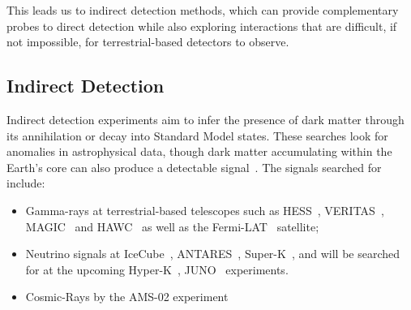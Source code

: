 This leads us to indirect detection methods, which can provide complementary probes to direct detection while also exploring interactions that are difficult, if not impossible, for terrestrial-based detectors to observe.
\subsection{Indirect Detection}

Indirect detection experiments aim to infer the presence of dark matter through its annihilation or decay into Standard Model states. 
These searches look for anomalies in astrophysical data, though dark matter accumulating within the Earth's core can also produce a detectable signal~\cite{Lee:2013iua_jan_Constrainingdarkmatter, ANTARES:2016bxz_SearchDarkMatter}. The signals searched for include: 
\begin{itemize}
    \item Gamma-rays at terrestrial-based telescopes such as HESS~\cite{HESS:2018cbt_may_SearchgRayLine, Montanari:2023bzn_jul_Searchdarkmatter, HESS:2006zwn_ObservationsGalacticCenter}, VERITAS~\cite{VERITAS:2017tif_apr_DarkMatterConstraints, Ryan:2023yzu_jul_SearchDarkMatter, McGrath:2023oto_jul_IndirectsearchDark, McGrath:2023oto_IndirectsearchDarkMcGrath:2023btk_IndirectsearchDark, Ryan:2023yzu_jul_SearchDarkMatter}, MAGIC~\cite{MAGIC:2009tyk_MAGICGammaRayTelescope, MAGIC:2011nta_SearchesDarkMatter, MAGIC:2011nta_SearchesDarkMatter, MAGIC:2009tyk_MAGICGammaRayTelescope} and HAWC~\cite{HAWC:2017mfa_feb_DarkMatterLimits, HAWC:2017udy_feb_SearchDarkMatter, HAWC:2017udy_feb_SearchDarkMatter, HAWC:2017mfa_feb_DarkMatterLimits, Proper:2015xya_jul_FirstLimitsDark, Harding:2015bua_jul_DarkMatterAnnihilation} as well as the Fermi-LAT~\cite{Fermi-LAT:2015att_nov_SearchingDarkMatter, Fermi-LAT:2015att_nov_SearchingDarkMatterFermi-LAT:2015kyq_nov_SearchingDarkMatter, Fermi-LAT:2012ugx_FermiLATSearch, Fermi-LAT:2010qeq_ConstraintsCosmologicalDark, Fermi-LAT:2015att_nov_SearchingDarkMatterFermi-LAT:2015kyq_nov_SearchingDarkMatter, Fermi-LAT:2015att_nov_SearchingDarkMatter, Su:2010qj_GiantGammarayBubbles} satellite;

    \item Neutrino signals at IceCube~\cite{IceCube:2016dgk_mar_Searchannihilatingdark, IceCube:2012ugg_mar_Searchdarkmatter}, ANTARES~\cite{ANTARES:2016bxz_SearchDarkMatter,ANTARES:2016obx_may_SearchSecludedDark,ANTARES:2016xuh_aug_LimitsDarkMatter}, Super-K~\cite{Super-Kamiokande:2015xms_apr_Searchneutrinosannihilationa,Super-Kamiokande:2004pou_Searchdarkmatter,Feng:2008qn_TestingDarkMatter}, and will be searched for at the upcoming Hyper-K~\cite{Bell:2020rkw_sep_SearchingSubGeVDark,Bell:2021esh_nov_Searchingdarkmatter,Bell:2022ycf_nov_Darkmatterpollution}, JUNO~\cite{Franarin:2018gfk_jun_JUNOSensitivityResonant} experiments.

    \item Cosmic-Rays by the AMS-02 experiment~\cite{Giesen:2015ufa_sep_AMS02antiprotonslast, Bergstrom:2013jra_oct_NewLimitsDark}
\end{itemize}

